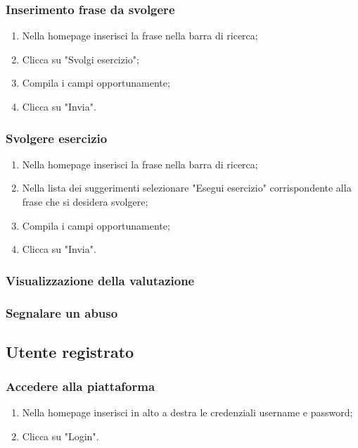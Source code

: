 \documentclass[11pt,a4paper]{article}
\begin{document}
{		\subsubsection{Inserimento frase da svolgere}
			
		\begin{enumerate}
			\item Nella homepage inserisci la frase nella barra di ricerca;
			\item Clicca su "Svolgi esercizio";
			\item Compila i campi opportunamente;
			\item Clicca su "Invia".
		\end{enumerate}
		
		\subsubsection{Svolgere esercizio}
			\begin{enumerate}
				\item Nella homepage inserisci la frase nella barra di ricerca;
				\item Nella lista dei suggerimenti selezionare "Esegui esercizio" corrispondente alla frase che si desidera svolgere;
				\item Compila i campi opportunamente;
				\item Clicca su "Invia".
			\end{enumerate}
		\subsubsection{Visualizzazione della valutazione}
		\subsubsection{Segnalare un abuso}
	
	\subsection{Utente registrato}
		\subsubsection{Accedere alla piattaforma}
		\begin{enumerate}
			\item Nella homepage inserisci in alto a destra le credenziali username e password;
			\item Clicca su "Login".
		\end{enumerate}
		
}
\end{document}

